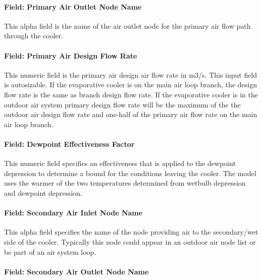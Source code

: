 \paragraph{Field: Primary Air Outlet Node Name}\label{field-primary-air-outlet-node-name-2}

This alpha field is the name of the air outlet node for the primary air flow path through the cooler.

\paragraph{Field: Primary Air Design Flow Rate}\label{fieldprimary-design-air-flow-rate-1}

This numeric field is the primary air design air flow rate in m3/s. This input field is autosizable. If the evaporative cooler is on the main air loop branch, the design flow rate is the same as branch design flow rate. If the evaporative cooler is in the outdoor air system primary design flow rate will be the maximum of the the outdoor air design flow rate and one-half of the primary air flow rate on the main air loop branch.

\paragraph{Field: Dewpoint Effectiveness Factor}\label{field-dewpoint-effectiveness-factor}

This numeric field specifies an effectiveness that is applied to the dewpoint depression to determine a bound for the conditions leaving the cooler. The model uses the warmer of the two temperatures determined from wetbulb depression and dewpoint depression.

\paragraph{Field: Secondary Air Inlet Node Name}\label{field-secondary-air-inlet-node-name-2}

This alpha field specifies the name of the node providing air to the secondary/wet side of the cooler. Typically this node could appear in an outdoor air node list or be part of an air system loop.

\paragraph{Field: Secondary Air Outlet Node Name}\label{field-secondary-air-outlet-node-name}

